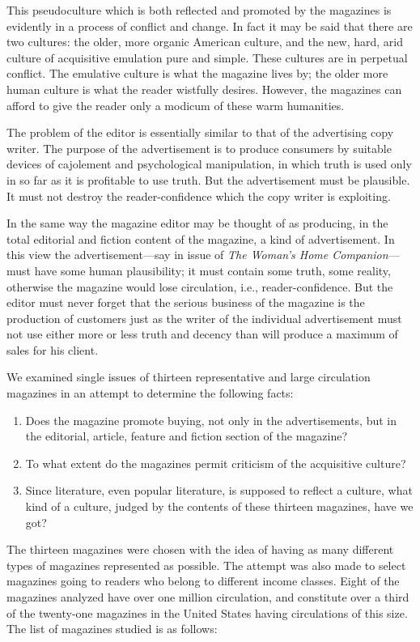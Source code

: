 \documentclass[nohyper,openany,nobib]{tufte-book}
\begin{document}
This pseudoculture which is both reflected and promoted by the magazines
is evidently in a process of conflict and change. In fact it may be said
that there are two cultures: the older, more organic American culture,
and the new, hard, arid culture of acquisitive emulation pure and
simple. These cultures are in perpetual conflict. The emulative culture
is what the magazine lives by; the older more human culture is what the
reader wistfully desires. However, the magazines can afford to give the
reader only a modicum of these warm humanities.

The problem of the editor is essentially similar to that of the
advertising copy writer. The purpose of the advertisement is to produce
consumers by suitable devices of cajolement and psychological
manipulation, in which truth is used only in so far as it is profitable
to use truth. But the advertisement must be plausible. It must not
destroy the reader-confidence which the copy writer is exploiting.

In the same way the magazine editor may be thought of as producing, in
the total editorial and fiction content of the magazine, a kind of
advertisement. In this view the advertisement---say in issue of
\emph{The Woman's Home Companion}---must have some human plausibility;
it must contain some truth, some reality, otherwise the magazine would
lose circulation, i.e., reader-confidence. But the editor must never
forget that the serious business of the magazine is the production of
customers just as the writer of the individual advertisement must not
use either more or less truth and decency than will produce a maximum of
sales for his client.

We examined single issues of thirteen representative and large
circulation magazines in an attempt to determine the following facts:

\begin{enumerate}
\item
  Does the magazine promote buying, not only in the advertisements, but
  in the editorial, article, feature and fiction section of the
  magazine?
\item
  To what extent do the magazines permit criticism of the acquisitive
  culture?
\item
  Since literature, even popular literature, is supposed to reflect a
  culture, what kind of a culture, judged by the contents of these
  thirteen magazines, have we got?
\end{enumerate}

The thirteen magazines were chosen with the idea of having as many
different types of magazines represented as possible. The attempt was
also made to select magazines going to readers who belong to different
income classes. Eight of the magazines analyzed have over one million
circulation, and constitute over a third of the twenty-one magazines in
the United States having circulations of this size. The list of
magazines studied is as follows:
\end{document}
